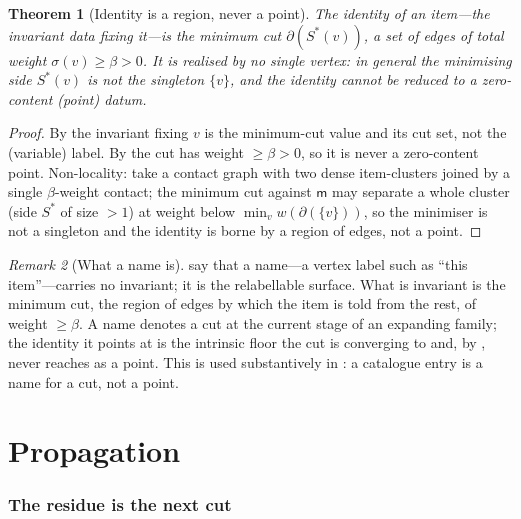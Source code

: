 \documentclass[11pt,a4paper]{article}
\theoremstyle{thmstyle}
\newtheorem{theorem}{Theorem}[section]
\theoremstyle{definition}
\theoremstyle{remark}
\newtheorem{remark}[theorem]{Remark}
\newcommand{\wt}{w}
\newcommand{\med}{\mathsf{m}}            %
\newcommand{\flo}{\beta}                 %
\newcommand{\cut}{\partial}              %
\newcommand{\str}{\sigma}                %
\begin{document}
\begin{theorem}[Identity is a region, never a point]
\label{thm:region}
The identity of an item---the invariant data fixing it---is the minimum
cut $\cut(S^{\ast}(v))$, a set of edges of total weight $\str(v)\ge\flo>0$.
It is realised by no single vertex: in general the minimising side
$S^{\ast}(v)$ is not the singleton $\{v\}$, and the identity cannot be
reduced to a zero-content (point) datum.
\end{theorem}

\begin{proof}
By  the invariant fixing $v$ is the minimum-cut value
and its cut set, not the (variable) label. By  the cut has
weight $\ge\flo>0$, so it is never a zero-content point. Non-locality: take
a contact graph with two dense item-clusters joined by a single
$\flo$-weight contact; the minimum cut against $\med$ may separate a whole
cluster (side $S^{\ast}$ of size $>1$) at weight below
$\min_v\wt(\cut(\{v\}))$, so the minimiser is not a singleton and the
identity is borne by a region of edges, not a point.
\end{proof}

\begin{remark}[What a name is]
\label{rem:name}
 say that a name---a vertex label such as
``this item''---carries no invariant; it is the relabellable surface. What
is invariant is the minimum cut, the region of edges by which the item is
told from the rest, of weight $\ge\flo$. A name denotes a cut at the
current stage of an expanding family; the identity it points at is the
intrinsic floor the cut is converging to and, by , never
reaches as a point. This is used substantively in :
a catalogue entry is a name for a cut, not a point.
\end{remark}

\part{Propagation}

\section{The residue is the next cut}
\label{sec:residue}
\end{document}
